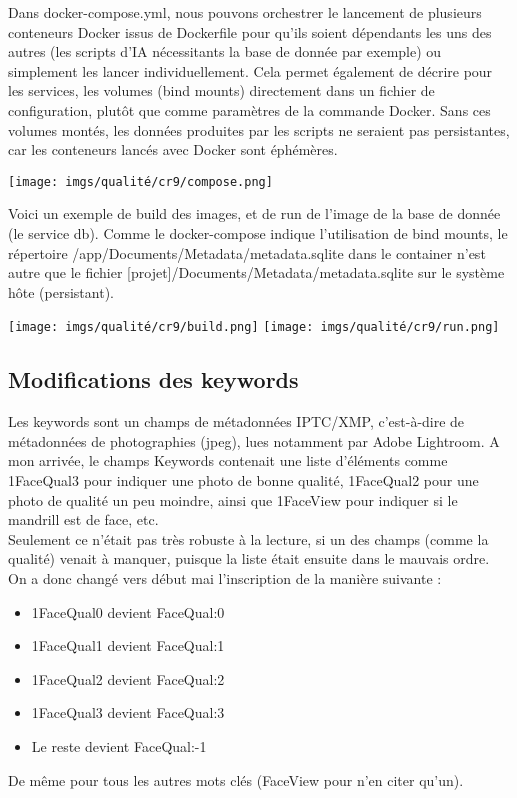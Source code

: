 Dans docker-compose.yml, nous pouvons orchestrer le lancement de plusieurs conteneurs Docker issus de Dockerfile pour qu'ils soient dépendants les uns des autres (les scripts d'IA nécessitants la base de donnée par exemple) ou simplement les lancer individuellement. Cela permet également de décrire pour les services, les volumes (bind mounts) directement dans un fichier de configuration, plutôt que comme paramètres de la commande Docker. Sans ces volumes montés, les données produites par les scripts ne seraient pas persistantes, car les conteneurs lancés avec Docker sont éphémères.
\begin{center}
    \texttt{[image: imgs/qualité/cr9/compose.png]}
\end{center}

Voici un exemple de build des images, et de run de l'image de la base de donnée (le service db). Comme le docker-compose indique l'utilisation de bind mounts, le répertoire /app/Documents/Metadata/metadata.sqlite dans le container n'est autre que le fichier [projet]/Documents/Metadata/metadata.sqlite sur le système hôte (persistant).
\begin{center}
    \texttt{[image: imgs/qualité/cr9/build.png]}
    \texttt{[image: imgs/qualité/cr9/run.png]}
\end{center}

\subsection{Modifications des keywords}
Les keywords sont un champs de métadonnées IPTC/\gls{XMP}, c'est-à-dire de métadonnées de photographies (jpeg), lues notamment par Adobe Lightroom. A mon arrivée, le champs Keywords contenait une liste d'éléments comme 1FaceQual3 pour indiquer une photo de bonne qualité, 1FaceQual2 pour une photo de qualité un peu moindre, ainsi que 1FaceView pour indiquer si le mandrill est de face, etc. \\ 

Seulement ce n'était pas très robuste à la lecture, si un des champs (comme la qualité) venait à manquer, puisque la liste était ensuite dans le mauvais ordre. On a donc changé vers début mai l'inscription de la manière suivante :
\begin{itemize}
    \item 1FaceQual0 devient FaceQual:0
    \item 1FaceQual1 devient FaceQual:1
    \item 1FaceQual2 devient FaceQual:2
    \item 1FaceQual3 devient FaceQual:3
    \item Le reste devient FaceQual:-1
\end{itemize}
De même pour tous les autres mots clés (FaceView pour n'en citer qu'un).

